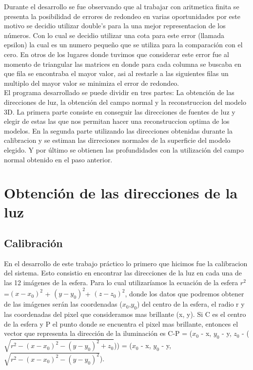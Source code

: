 Durante el desarrollo se fue observando que al trabajar con aritmetica finita se presenta la posibilidad de errores de redondeo en varias oportunidades por este motivo se decidio utilizar double's para la una mejor representacion de los números. Con lo cual se decidio utilizar una cota para este error (llamada epsilon) la cual es un numero pequeño que se utiliza para la comparación con el cero. En otros de los lugares donde tuvimos que considerar este error fue al momento de triangular las matrices en donde para cada columna se buscaba en que fila se encontraba el mayor valor, asi al restarle a las siguientes filas un multiplo del mayor valor se minimiza el error de redondeo. \\


El programa desarrollado se puede dividir en tres partes: La obtención de las direcciones de luz, la obtención del campo normal y la reconstruccion del modelo 3D.
La primera parte consiste en conseguir las direcciones de fuentes de luz y elegir de estas las que nos permitan hacer una reconstruccion optima de los modelos.
En la segunda parte utilizando las direcciones obtenidas durante la calibracion y se estiman las dirreciones normales de la superficie del modelo elegido.
Y por último se obtienen las profundidades con la utilización del campo normal obtenido en el paso anterior.

\section{Obtención de las direcciones de la luz}

\subsection{Calibración}

En el desarrollo de este trabajo práctico lo primero que hicimos fue la calibracion del sistema. Esto consistio
en encontrar las direcciones de la luz en cada una de las 12 imágenes de la esfera. Para lo cual utilizaríamos la ecuación de la esfera $r^{2}$=$(x-x_{0})^{2}$ + $(y-y_{0})^{2}$+ $(z-z_{0})^{2}$, donde los datos que podremos obtener de las imágenes serán las coordenadas ($x_{0}$,$y_{0}$) del centro de la esfera, el radio r y las coordenadas del pixel que consideramos mas brillante (x, y). Si C es el centro de la esfera y P el punto donde se encuentra el pixel mas brillante, entonces el vector que representa la dirección de la iluminación 
es C-P = ($x_{0}$ - x, $y_{0}$ - y, $z_{0}$ - ($ \sqrt{r^{2} - (x-x_{0})^{2} - (y-y_{0})^{2} + z_{0}}$)) = ($x_{0}$ - x, $y_{0}$ - y, $\sqrt{r^{2} - (x-x_{0})^{2} - (y-y_{0})^{2}}$). \\

